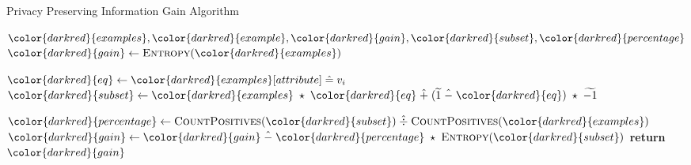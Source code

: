 \begin{algorithm}[H]
\caption{Privacy Preserving Information Gain Algorithm}\label{a:id3-gain-pp}
\begin{algorithmic}[1]
\Require ${\color{darkred}{examples}}, {\color{darkred}{example}}, {\color{darkred}{gain}}, {\color{darkred}{subset}}, {\color{darkred}{percentage}}$
    \State ${\color{darkred}{gain}} \gets \textsc{Entropy}({\color{darkred}{examples}})$

        \State ${\color{darkred}{eq}} \gets {\color{darkred}{examples}}[attribute] \heq v_i$ 
        \State ${\color{darkred}{subset}} \gets {\color{darkred}{examples}} \hmul {\color{darkred}{eq}} \hplus (\enc{1} \hminus {\color{darkred}{eq}}) \hmul \enc{-1} $ 

        \State ${\color{darkred}{percentage}} \gets \textsc{CountPositives}({\color{darkred}{subset}}) \hdiv \textsc{CountPositives}({\color{darkred}{examples}})$
        \State ${\color{darkred}{gain}} \gets {\color{darkred}{gain}} \hminus {\color{darkred}{percentage}} \hmul \textsc{Entropy}({\color{darkred}{subset}})$
    \EndFor
    \State \textbf{return} ${\color{darkred}{gain}}$
\EndProcedure
\end{algorithmic}
\end{algorithm}
